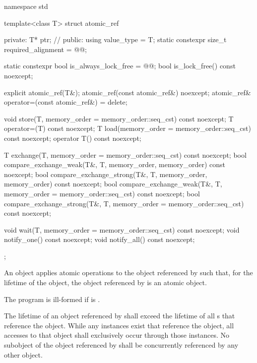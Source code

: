 %
%
\begin{codeblock}
namespace std {
  template<class T> struct atomic_ref {
  private:
    T* ptr;             // \expos
  public:
    using value_type = T;
    static constexpr size_t required_alignment = @@;

    static constexpr bool is_always_lock_free = @@;
    bool is_lock_free() const noexcept;

    explicit atomic_ref(T&);
    atomic_ref(const atomic_ref&) noexcept;
    atomic_ref& operator=(const atomic_ref&) = delete;

    void store(T, memory_order = memory_order::seq_cst) const noexcept;
    T operator=(T) const noexcept;
    T load(memory_order = memory_order::seq_cst) const noexcept;
    operator T() const noexcept;

    T exchange(T, memory_order = memory_order::seq_cst) const noexcept;
    bool compare_exchange_weak(T&, T,
                               memory_order, memory_order) const noexcept;
    bool compare_exchange_strong(T&, T,
                                 memory_order, memory_order) const noexcept;
    bool compare_exchange_weak(T&, T,
                               memory_order = memory_order::seq_cst) const noexcept;
    bool compare_exchange_strong(T&, T,
                                 memory_order = memory_order::seq_cst) const noexcept;

    void wait(T, memory_order = memory_order::seq_cst) const noexcept;
    void notify_one() const noexcept;
    void notify_all() const noexcept;
  };
}
\end{codeblock}

\pnum
An  object applies atomic operations to
the object referenced by  such that,
for the lifetime of the  object,
the object referenced by  is an atomic object.

\pnum
The program is ill-formed if  is .

\pnum
The lifetime of an object referenced by 
shall exceed the lifetime of all s that reference the object.
While any  instances exist
that reference the  object,
all accesses to that object shall exclusively occur
through those  instances.
No subobject of the object referenced by 
shall be concurrently referenced by any other  object.


